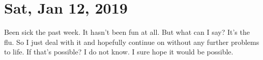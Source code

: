 \section{Sat, Jan 12, 2019}

Been sick the past week. It hasn't been fun at all. But what can I say?
It's the flu. So I just deal with it and hopefully continue on without
any further problems to life. If that's possible? I do not know. I sure
hope it would be possible.
